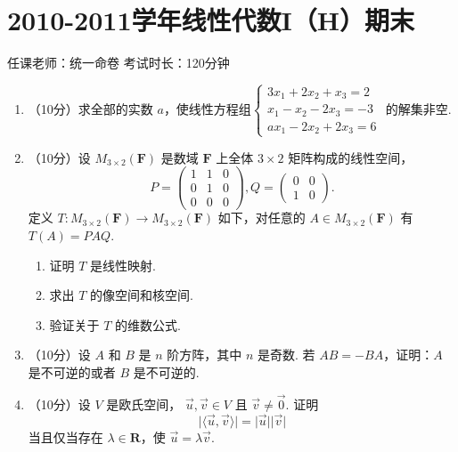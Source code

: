\section{2010-2011学年线性代数I（H）期末}

\begin{center}
    任课老师：统一命卷\hspace{4em} 考试时长：120分钟
\end{center}

\begin{enumerate}
    \item （10分）求全部的实数 $a$，使线性方程组$\begin{cases} 3x_1+2x_2+x_3=2 \\ x_1-x_2-2x_3=-3 \\ ax_1-2x_2+2x_3 = 6\end{cases}$ 的解集非空.

    \item （10分）设 $M_{3\times2} (\mathbf{F})$ 是数域 $\mathbf{F}$ 上全体 $3\times 2$ 矩阵构成的线性空间，
    \[P = \begin{pmatrix}1 & 1 & 0 \\ 0 & 1 & 0 \\ 0 & 0 & 0\end{pmatrix},Q=\begin{pmatrix}0 & 0 \\ 1 & 0\end{pmatrix}.\]
    定义 $T\colon M_{3\times 2}(\mathbf{F}) \to M_{3\times2} (\mathbf{F})$ 如下，对任意的 $A\in M_{3\times2}(\mathbf{F})$ 有 $T(A) = PAQ$.
    \begin{enumerate}
        \item 证明 $T$ 是线性映射.

        \item 求出 $T$ 的像空间和核空间.

        \item 验证关于 $T$ 的维数公式.
    \end{enumerate}

\item （10分）设 $A$ 和 $B$ 是 $n$ 阶方阵，其中 $n$ 是奇数. 若 $AB=-BA$，证明：$A$ 是不可逆的或者 $B$ 是不可逆的.

    \item （10分）设 $V$ 是欧氏空间， $\vec{u},\vec{v}\in V$ 且 $\vec{v} \neq \vec{0}$.  证明
    \[\lvert\langle\vec{u},\vec{v}\rangle\rvert =\lvert \vec{u} \rvert \lvert \vec{v} \rvert \]
    当且仅当存在 $\lambda \in \mathbf{R}$，使 $\vec{u} = \lambda \vec{v}$.


\end{enumerate}
